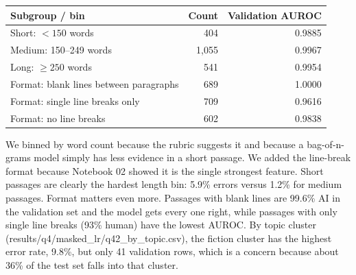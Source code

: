 \begin{tabularx}{\linewidth}{@{}Yrr@{}}\toprule Subgroup / bin & Count & Validation AUROC \\ \midrule
Short: $<150$ words & 404 & 0.9885 \\
Medium: 150--249 words & 1{,}055 & 0.9967 \\
Long: $\geq 250$ words & 541 & 0.9954 \\
\midrule
Format: blank lines between paragraphs & 689 & 1.0000 \\
Format: single line breaks only & 709 & 0.9616 \\
Format: no line breaks & 602 & 0.9838 \\
\bottomrule\end{tabularx}
\par\noindent
We binned by word count because the rubric suggests it and because a bag-of-n-grams model simply has less evidence in a short passage. We added the line-break format because Notebook 02 showed it is the single strongest feature. Short passages are clearly the hardest length bin: 5.9\% errors versus 1.2\% for medium passages. Format matters even more. Passages with blank lines are 99.6\% AI in the validation set and the model gets every one right, while passages with only single line breaks (93\% human) have the lowest AUROC. By topic cluster (results/q4/masked\_lr/q42\_by\_topic.csv), the fiction cluster has the highest error rate, 9.8\%, but only 41 validation rows, which is a concern because about 36\% of the test set falls into that cluster.

